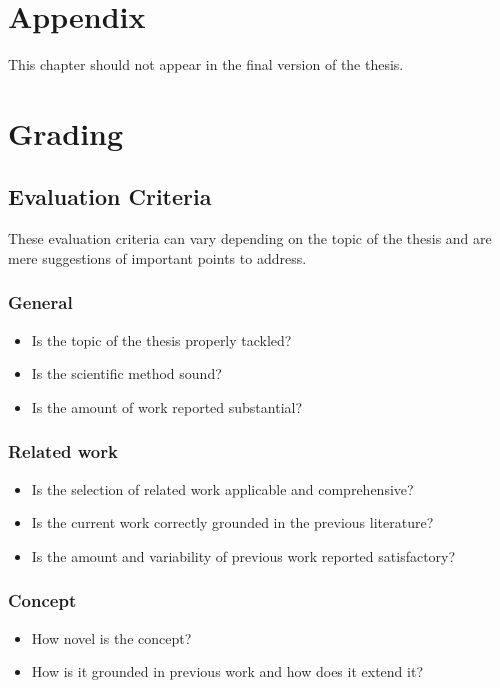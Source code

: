 \chapter{Appendix}


\begin{fullwidth}
\textcolor[RGB]{175,0,0}{
	\LARGE This chapter should not appear in the final version of the thesis.
	}
\end{fullwidth}


\chapter*{Grading}


\section{Evaluation Criteria}

These evaluation criteria can vary depending on the topic of the thesis and are mere suggestions of important points to address.

 
\subsection{General}
\begin{itemize}
    \item Is the topic of the thesis properly tackled?
    \item Is the scientific method sound?
    \item Is the amount of work reported substantial? 
\end{itemize}

\subsection{Related work}
\begin{itemize}
    \item Is the selection of related work applicable and comprehensive?
    \item Is the current work correctly grounded in the previous literature?
    \item Is the amount and variability of previous work reported satisfactory? 
\end{itemize}

\subsection{Concept}
\begin{itemize}
    \item How novel is the concept?
    \item How is it grounded in previous work and how does it extend it? 
\end{itemize}
    
